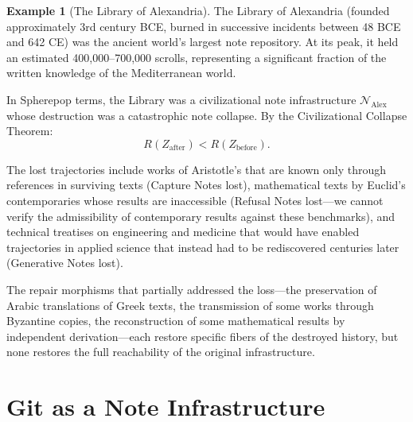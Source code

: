 \documentclass[12pt, a4paper, openany]{book}
\theoremstyle{plain}
\theoremstyle{definition}
\newtheorem{example}[theorem]{Example}
\theoremstyle{remark}
\newcommand{\calN}{\mathcal{N}}
\begin{document}
\begin{example}[The Library of Alexandria]
The Library of Alexandria (founded approximately 3rd century BCE, burned in
successive incidents between 48 BCE and 642 CE) was the ancient world's
largest note repository. At its peak, it held an estimated 400,000--700,000
scrolls, representing a significant fraction of the written knowledge of the
Mediterranean world.

In Spherepop terms, the Library was a civilizational note infrastructure
$\calN_{\mathrm{Alex}}$ whose destruction was a catastrophic note collapse.
By the Civilizational Collapse Theorem:
\[
R(Z_{\mathrm{after}}) < R(Z_{\mathrm{before}}).
\]

The lost trajectories include works of Aristotle's that are known only through
references in surviving texts (Capture Notes lost), mathematical texts by
Euclid's contemporaries whose results are inaccessible (Refusal Notes lost---we
cannot verify the admissibility of contemporary results against these benchmarks),
and technical treatises on engineering and medicine that would have enabled
trajectories in applied science that instead had to be rediscovered centuries
later (Generative Notes lost).

The repair morphisms that partially addressed the loss---the preservation of
Arabic translations of Greek texts, the transmission of some works through
Byzantine copies, the reconstruction of some mathematical results by independent
derivation---each restore specific fibers of the destroyed history, but none
restores the full reachability of the original infrastructure.
\end{example}

\section{Git as a Note Infrastructure}
\end{document}
